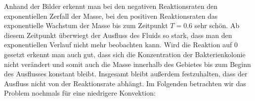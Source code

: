 Anhand der Bilder erkennt man bei den negativen Reaktionsraten
den exponentiellen Zerfall der Masse, bei den positiven Reaktionsraten das exponentielle Wachstum der Masse bis zum Zeitpunkt $T=0.6$ sehr schön. Ab diesem Zeitpunkt überwiegt der Ausfluss des Fluids so stark, dass man den exponentiellen Verlauf nicht mehr beobachten kann.
Wird die Reaktion auf $0$ gesetzt erkennt man auch gut, dass sich die Konzentration der Bakterienkolonie nicht verändert und somit auch die Masse innerhalb des Gebietes bis zum Beginn des Ausflusses konstant bleibt.
Insgesamt bleibt außerdem festzuhalten, dass der Ausfluss nicht von der Reaktionsrate abhängt. 
Im Folgenden betrachten wir das Problem nochmals für eine niedrigere Konvektion:

\begin{figure}[H]
	\centering

\end{figure}
